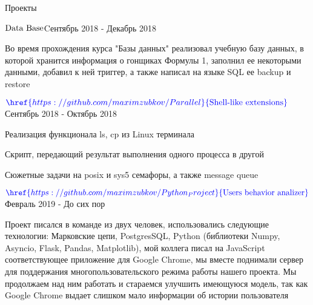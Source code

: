 \documentclass{resume} %
\begin{document}




\begin{rSection}{Проекты}

\begin{rSubsection}{$\textnormal{Data Base}$}{Cентябрь 2018 - Декабрь 2018}{}{}
\item Во время прохождения курса "Базы данных" реализовал учебную базу данных, в которой хранится информация о гонщиках Формулы 1, заполнил ее некоторыми данными, добавил к ней триггер, а также написал на языке SQL ее backup и restore
\end{rSubsection}

\begin{rSubsection}{$\textcolor{blue}{\href{https://github.com/maximzubkov/Parallel}{\textnormal{Shell-like extensions}}}$}{Сентябрь 2018 - Октябрь 2018}{}{}
\item Реализация функционала ls, cp из Linux терминала
\item Скрипт, передающий результат выполнения одного процесса в другой
\item Сюжетные задачи на posix и sys5 семафоры, а также message queue
\end{rSubsection}

\begin{rSubsection}{$\textcolor{blue}{\href{https://github.com/maximzubkov/Python_Project}{\textnormal{Users behavior analizer}}}$}{Февраль 2019 - До сих пор}{}{}
\item Проект писался в команде из двух человек, использовались следующие технологии: Марковские цепи, PostgresSQL, Python (библиотеки Numpy, Asyncio, Flask, Pandas, Matplotlib), мой коллега писал на JavaScript соответствующее приложение для Google Chrome, мы вместе поднимали сервер для поддержания многопользовательского режима работы нашего проекта. Мы продолжаем над ним работать и стараемся улучшить имеющуюся модель, так как Google Chrome выдает слишком мало информации об истории пользователя
\end{rSubsection}


\end{rSection}
\end{document}
